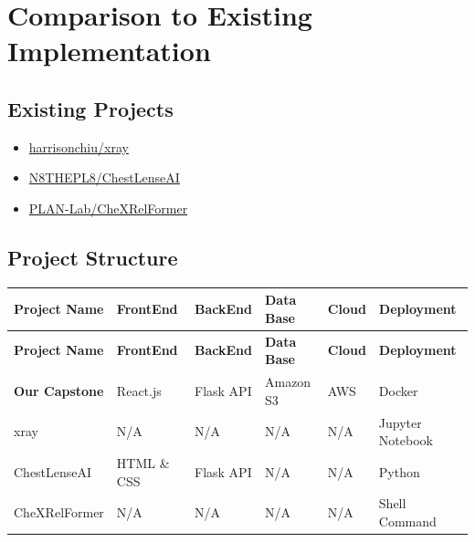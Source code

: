 \documentclass[12pt, titlepage]{article}
\begin{document}
\clearpage
\newpage
\section{Comparison to Existing Implementation}	

\subsection{Existing Projects}
\begin{itemize}
    \item \href{https://github.com/harrisonchiu/xray/tree/main}{harrisonchiu/xray}
    \item \href{https://github.com/N8THEPL8/ChestLenseAI/tree/main}{N8THEPL8/ChestLenseAI}
    \item \href{https://github.com/PLAN-Lab/CheXRelFormer/tree/main}{PLAN-Lab/CheXRelFormer}
\end{itemize}

\subsection{Project Structure}

\begin{longtable}{|l|l|l|l|l|l|}
\hline
\textbf{Project Name}   & \textbf{FrontEnd}       & \textbf{BackEnd}   & \textbf{Data Base} & \textbf{Cloud} & \textbf{Deployment} \\ \hline
\endfirsthead
\hline
\textbf{Project Name}   & \textbf{FrontEnd}       & \textbf{BackEnd}   & \textbf{Data Base} & \textbf{Cloud} & \textbf{Deployment} \\ \hline
\endhead
\hline
\endfoot

\textbf{Our Capstone}    & React.js               & Flask API          & Amazon S3          & AWS             & Docker             \\ \hline
xray                    & N/A                    & N/A                & N/A                & N/A             & Jupyter Notebook   \\ \hline
ChestLenseAI            & HTML \& CSS             & Flask API          & N/A                & N/A             & Python             \\ \hline
CheXRelFormer           & N/A                    & N/A                & N/A                & N/A             & Shell Command      \\ \hline

\end{longtable}
\end{document}
